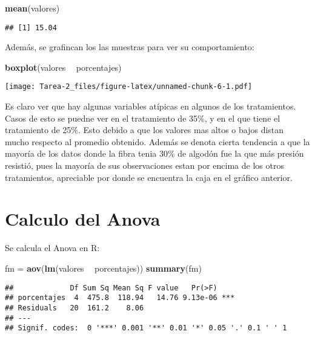 \documentclass[]{article}
\newenvironment{Shaded}{\begin{snugshade}}{\end{snugshade}}
\newcommand{\KeywordTok}[1]{\textcolor[rgb]{0.13,0.29,0.53}{\textbf{#1}}}
\newcommand{\StringTok}[1]{\textcolor[rgb]{0.31,0.60,0.02}{#1}}
\newcommand{\OperatorTok}[1]{\textcolor[rgb]{0.81,0.36,0.00}{\textbf{#1}}}
\newcommand{\NormalTok}[1]{#1}
\begin{document}
\begin{Shaded}
\begin{Highlighting}[]
\KeywordTok{mean}\NormalTok{(valores)}
\end{Highlighting}
\end{Shaded}

\begin{verbatim}
## [1] 15.04
\end{verbatim}

Además, se grafincan los las muestras para ver su comportamiento:

\begin{Shaded}
\begin{Highlighting}[]
\KeywordTok{boxplot}\NormalTok{(valores }\OperatorTok{~}\StringTok{ }\NormalTok{porcentajes)}
\end{Highlighting}
\end{Shaded}

\texttt{[image: Tarea-2\_files/figure-latex/unnamed-chunk-6-1.pdf]}

Es claro ver que hay algunas variables atípicas en algunos de los
tratamientos. Casos de esto se puedne ver en el tratamiento de 35\%, y
en el que tiene el tratamiento de 25\%. Esto debido a que los valores
mas altos o bajos distan mucho respecto al promedio obtenido. Además se
denota cierta tendencia a que la mayoría de los datos donde la fibra
tenia 30\% de algodón fue la que más presión resistió, pues la mayoría
de sus observaciones estan por encima de los otros tratamientos,
apreciable por donde se encuentra la caja en el gráfico anterior.

\section{Calculo del Anova}\label{calculo-del-anova}

Se calcula el Anova en R:

\begin{Shaded}
\begin{Highlighting}[]
\NormalTok{fm =}\StringTok{ }\KeywordTok{aov}\NormalTok{(}\KeywordTok{lm}\NormalTok{(valores }\OperatorTok{~}\StringTok{ }\NormalTok{porcentajes))}
\KeywordTok{summary}\NormalTok{(fm)}
\end{Highlighting}
\end{Shaded}

\begin{verbatim}
##             Df Sum Sq Mean Sq F value   Pr(>F)    
## porcentajes  4  475.8  118.94   14.76 9.13e-06 ***
## Residuals   20  161.2    8.06                     
## ---
## Signif. codes:  0 '***' 0.001 '**' 0.01 '*' 0.05 '.' 0.1 ' ' 1
\end{verbatim}
\end{document}

